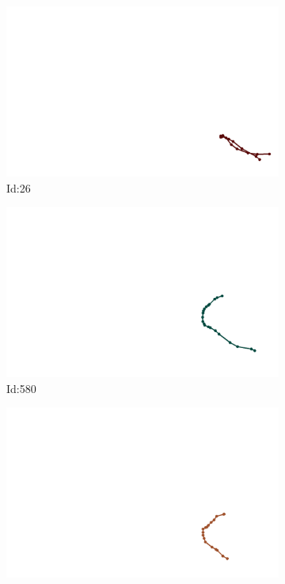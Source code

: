 \documentclass[12pt,twoside]{report}
\begin{document}
\begin{figure}
\centering
\begin{subfigure}[b]{0.20\textwidth}
\centering
\includegraphics[width=\textwidth]{../../trajectories/26.png}
\caption{Id:26}
\end{subfigure}
\begin{subfigure}[b]{0.20\textwidth}
\centering
\includegraphics[width=\textwidth]{../../trajectories/580.png}
\caption{Id:580}
\end{subfigure}
\begin{subfigure}[b]{0.20\textwidth}
\centering
\includegraphics[width=\textwidth]{../../trajectories/586.png}

\end{subfigure}
\end{figure}
\end{document}
